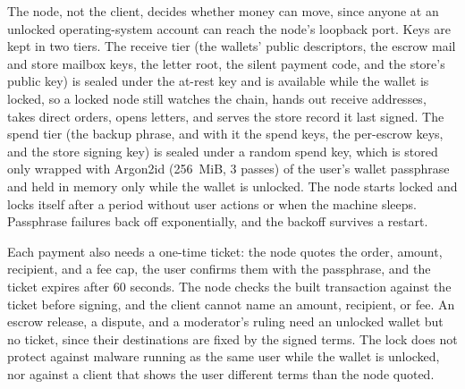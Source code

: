 The node, not the client, decides whether money can move, since anyone at an unlocked operating-system account can reach the node's loopback port. Keys are kept in two tiers. The receive tier (the wallets' public descriptors, the escrow mail and store mailbox keys, the letter root, the silent payment code, and the store's public key) is sealed under the at-rest key and is available while the wallet is locked, so a locked node still watches the chain, hands out receive addresses, takes direct orders, opens letters, and serves the store record it last signed. The spend tier (the backup phrase, and with it the spend keys, the per-escrow keys, and the store signing key) is sealed under a random spend key, which is stored only wrapped with Argon2id (256~MiB, 3 passes) of the user's wallet passphrase and held in memory only while the wallet is unlocked. The node starts locked and locks itself after a period without user actions or when the machine sleeps. Passphrase failures back off exponentially, and the backoff survives a restart.

Each payment also needs a one-time ticket: the node quotes the order, amount, recipient, and a fee cap, the user confirms them with the passphrase, and the ticket expires after 60 seconds. The node checks the built transaction against the ticket before signing, and the client cannot name an amount, recipient, or fee. An escrow release, a dispute, and a moderator's ruling need an unlocked wallet but no ticket, since their destinations are fixed by the signed terms. The lock does not protect against malware running as the same user while the wallet is unlocked, nor against a client that shows the user different terms than the node quoted.

